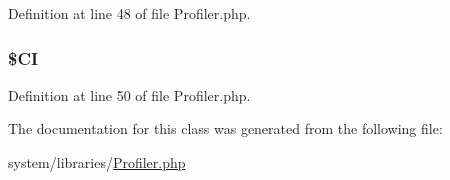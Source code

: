 Definition at line 48 of file Profiler.\-php.

\hypertarget{class_c_i___profiler_ae0314d046ddf7fcfaec03222977427d3}{
\subsubsection[{\$\-C\-I}]{\setlength{\rightskip}{0pt plus 5cm}\$C\-I\hspace{0.3cm}{\ttfamily [protected]}}}\label{class_c_i___profiler_ae0314d046ddf7fcfaec03222977427d3}


Definition at line 50 of file Profiler.\-php.



The documentation for this class was generated from the following file\-:\begin{DoxyCompactItemize}
\item 
system/libraries/\hyperlink{system_2libraries_2profiler_8php}{Profiler.\-php}\end{DoxyCompactItemize}
